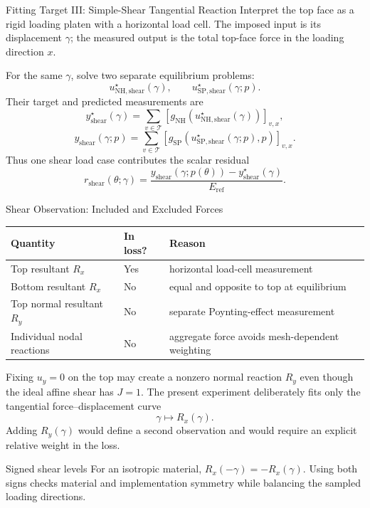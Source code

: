 \documentclass[aspectratio=169,10pt]{beamer}
\newcommand{\eref}{E_{\mathrm{ref}}}
\begin{document}
\begin{frame}{Fitting Target III: Simple-Shear Tangential Reaction}
  \small
  Interpret the top face as a rigid loading platen with a horizontal load
  cell. The imposed input is its displacement $\gamma$; the measured output
  is the total top-face force in the loading direction $x$.

  For the same $\gamma$, solve two separate equilibrium problems:
  \[
    u_{\mathrm{NH,shear}}^\star(\gamma),
    \qquad
    u_{\mathrm{SP,shear}}^\star(\gamma;p).
  \]
  Their target and predicted measurements are
  \[
    \boxed{
      y_{\mathrm{shear}}^\star(\gamma)
      =
      \sum_{v\in\mathcal T}
      [g_{\mathrm{NH}}(u_{\mathrm{NH,shear}}^\star(\gamma))]_{v,x}
    },
  \]
  \[
    \boxed{
      y_{\mathrm{shear}}(\gamma;p)
      =
      \sum_{v\in\mathcal T}
      [g_{\mathrm{SP}}(u_{\mathrm{SP,shear}}^\star(\gamma;p),p)]_{v,x}
    }.
  \]
  Thus one shear load case contributes the scalar residual
  \[
    \boxed{
      r_{\mathrm{shear}}(\theta;\gamma)
      =
      \frac{
        y_{\mathrm{shear}}(\gamma;p(\theta))
        -y_{\mathrm{shear}}^\star(\gamma)
      }{\eref}
    }.
  \]
\end{frame}

\begin{frame}{Shear Observation: Included and Excluded Forces}
  \small
  \begin{table}
    \centering
    \begin{tabular}{lll}
      \toprule
      Quantity & In loss? & Reason \\
      \midrule
      Top resultant $R_x$ & Yes &
      horizontal load-cell measurement \\
      Bottom resultant $R_x$ & No &
      equal and opposite to top at equilibrium \\
      Top normal resultant $R_y$ & No &
      separate Poynting-effect measurement \\
      Individual nodal reactions & No &
      aggregate force avoids mesh-dependent weighting \\
      \bottomrule
    \end{tabular}
  \end{table}

  Fixing $u_y=0$ on the top may create a nonzero normal reaction $R_y$ even
  though the ideal affine shear has $J=1$. The present experiment deliberately
  fits only the tangential force--displacement curve
  \[
    \gamma\longmapsto R_x(\gamma).
  \]
  Adding $R_y(\gamma)$ would define a second observation and would require an
  explicit relative weight in the loss.

  \begin{block}{Signed shear levels}
    For an isotropic material,
    $R_x(-\gamma)=-R_x(\gamma)$. Using both signs checks material and
    implementation symmetry while balancing the sampled loading directions.
  \end{block}
\end{frame}
\end{document}
